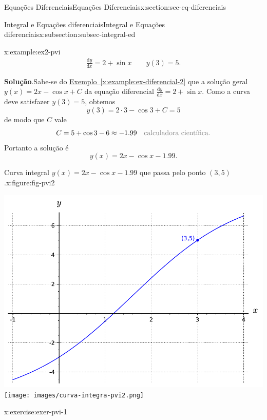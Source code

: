\documentclass[oneside,10pt,]{article}
\newcommand{\blocktitlefont}{\relax}
\newcommand{\xreffont}{\relax}
\numberwithin{equation}{section}
\newcommand{\dd}{\mathrm{d}}
\begin{document}
\begin{sectionptx}{Equações Diferenciais}{}{Equações Diferenciais}{}{}{x:section:sec-eq-diferenciais}
\begin{subsectionptx}{Integral e Equações diferenciais}{}{Integral e Equações diferenciais}{}{}{x:subsection:subsec-integral-ed}
\begin{example}{}{x:example:ex2-pvi}
\begin{gather*}
\frac{\dd y}{\dd x}= 2+ \sin{x} \qquad y(3)=5 \text{.}
\end{gather*}
%
\par\smallskip%
\noindent\textbf{\blocktitlefont Solução}.\hypertarget{g:solution:idp73}{}\quad{}Sabe-se do \hyperref[x:example:ex-diferencial-2]{Exemplo~{\xreffont\ref{x:example:ex-diferencial-2}}} que a solução geral \(y(x)=2x - \cos{x} +C\) da equação diferencial \(\frac{\dd y}{\dd x}= 2+ \sin{x}\). Como a curva deve satisfazer \(y(3)=5\), obtemos%
\begin{equation*}
y(3)=2\cdot 3-\cos{3} + C=5
\end{equation*}
de modo que \(C\) vale%
\begin{equation*}
C = 5+\cos{3}-6 \approx -1.99 \quad \color{gray}{\text{calculadora científica}}\text{.}
\end{equation*}
Portanto a solução é%
\begin{equation*}
y(x)= 2x - \cos{x} - 1.99\text{.}
\end{equation*}
\begin{figureptx}{Curva integral \(y(x)= 2x - \cos{x} - 1.99\) que passa pelo ponto \((3,5)\).}{x:figure:fig-pvi2}{}%
\begin{image}{0.25}{0.5}{0.25}%
%
{\includegraphics[width=\linewidth]{images/curva-integra-pvi2.pdf}}%
{\texttt{[image: images/curva-integra-pvi2.png]}}
\end{image}%
\tcblower
\end{figureptx}%
%
\end{example}
\begin{inlineexercise}{}{x:exercise:exer-pvi-1}%

\end{inlineexercise}
\end{subsectionptx}
\end{sectionptx}
\end{document}
